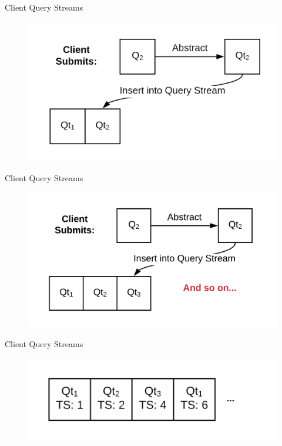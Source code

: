 \documentclass[10pt]{beamer}
\begin{document}
\begin{frame}[fragile]{Client Query Streams}
    \begin{figure}
        \includegraphics[scale=0.2]{apollo_client_query_stream_0_4}
    \end{figure}
\end{frame}

\begin{frame}[fragile]{Client Query Streams}
    \begin{figure}
        \includegraphics[scale=0.2]{apollo_client_query_stream_0_5}
    \end{figure}
\end{frame}

\begin{frame}[fragile]{Client Query Streams}
    \begin{figure}
        \includegraphics[scale=0.2]{apollo_client_query_stream}
    \end{figure}
\end{frame}
\end{document}
